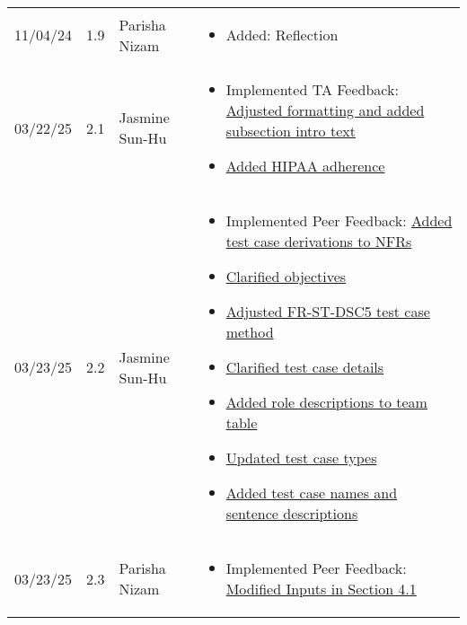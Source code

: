 \documentclass[12pt, titlepage]{article}
\begin{document}
\begin{longtable}{p{2cm}p{1cm}p{4cm}p{8cm}}
11/04/24 & 1.9 & Parisha Nizam &
\begin{itemize}[noitemsep, topsep=0pt]
  \item Added: Reflection
\end{itemize} \\

03/22/25 & 2.1 & Jasmine Sun-Hu &
\begin{itemize}[noitemsep, topsep=0pt]
  \item Implemented TA Feedback: \href{https://github.com/parishanizam/TeleHealth/issues/292}{Adjusted formatting and added subsection intro text}
  \item \href{https://github.com/parishanizam/TeleHealth/issues/293}{Added HIPAA adherence}
\end{itemize} \\

03/23/25 & 2.2 & Jasmine Sun-Hu &
\begin{itemize}[noitemsep, topsep=0pt]
  \item Implemented Peer Feedback: \href{https://github.com/parishanizam/TeleHealth/issues/224}{Added test case derivations to NFRs}
  \item \href{https://github.com/parishanizam/TeleHealth/issues/223}{Clarified objectives}
  \item \href{https://github.com/parishanizam/TeleHealth/issues/222}{Adjusted FR-ST-DSC5 test case method}
  \item \href{https://github.com/parishanizam/TeleHealth/issues/221}{Clarified test case details}
  \item \href{https://github.com/parishanizam/TeleHealth/issues/206}{Added role descriptions to team table}
  \item \href{https://github.com/parishanizam/TeleHealth/issues/205}{Updated test case types}
  \item \href{https://github.com/parishanizam/TeleHealth/issues/204}{Added test case names and sentence descriptions}
\end{itemize} \\

03/23/25 & 2.3 & Parisha Nizam &
\begin{itemize}[noitemsep, topsep=0pt]
  \item Implemented Peer Feedback: \href{https://github.com/parishanizam/TeleHealth/issues/534}{Modified Inputs in Section 4.1}
\end{itemize} \\

\bottomrule
\end{longtable}
\end{document}
